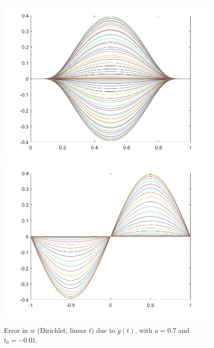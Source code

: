 \documentclass[11pt, a4paper]{article}
\theoremstyle{definition}
\begin{document}
\begin{figure}[h]
	\includegraphics[scale=0.3]{PerttimeD3.jpg}
	\includegraphics[scale=0.3]{PerttimeD4.jpg}
	\caption{Error in $w$ (Dirichlet, linear $t$) due to $\tilde g(t)$, with $a =0.7$ and $t_0 = -0.01$.}
	\label{Perttime4}
\end{figure}
\end{document}
